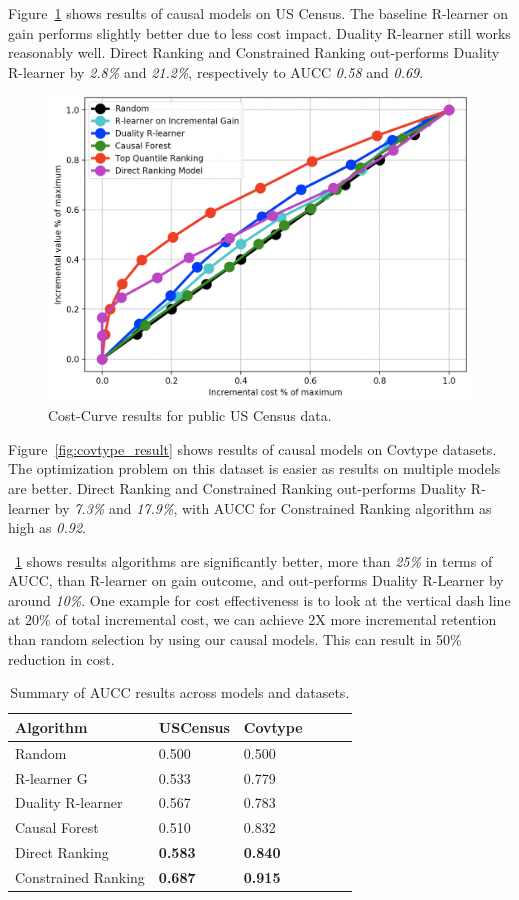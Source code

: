 \documentclass{article}
\begin{document}
Figure~\ref{fig:uscensus_result} shows results of causal models on US Census. The baseline R-learner on gain performs slightly better due to less cost impact. Duality R-learner still works reasonably well. Direct Ranking and Constrained Ranking out-performs Duality R-learner by \emph{2.8\%} and \emph{21.2\%}, respectively to AUCC \emph{0.58} and \emph{0.69}. 
\begin{figure}[h] 
  \includegraphics[width=0.75\linewidth]{figures/uscensus_result} 
  \caption{Cost-Curve results for public US Census data.} 
  \label{fig:uscensus_result} 
\end{figure} 
\vspace{-0.1cm} 
Figure~\ref{fig:covtype_result} shows results of causal models on Covtype datasets. The optimization problem on this dataset is easier as results on multiple models are better. Direct Ranking and Constrained Ranking out-performs Duality R-learner by \emph{7.3\%} and \emph{17.9\%}, with AUCC for Constrained Ranking algorithm as high as \emph{0.92}. 

~\ref{tab:summary_result_table} shows results  algorithms are significantly better, more than \emph{25\%} in terms of AUCC, than R-learner on gain outcome, and out-performs Duality R-Learner by around \emph{10\%}. One example for cost effectiveness is to look at the vertical dash line at $20\%$ of total incremental cost, we can achieve 2X more incremental retention than random selection by using our causal models. This can result in 50\% reduction in cost. 
\begin{table}
  \caption{Summary of AUCC results across models and datasets.} 
  \label{tab:summary_result_table}
  \begin{tabular}{llllll}
    \toprule
    Algorithm & USCensus &Covtype \\ 
    \midrule 
    Random & 0.500 & 0.500 \\
    \midrule 
    R-learner G & 0.533 & 0.779 \\
    Duality R-learner & 0.567 & 0.783 \\
    Causal Forest & 0.510 & 0.832 \\
    Direct Ranking & \textbf{0.583} & \textbf{0.840} \\
    Constrained Ranking & \textbf{0.687} & \textbf{0.915} \\
    \bottomrule
\end{tabular}
\end{table} 
\end{document}
